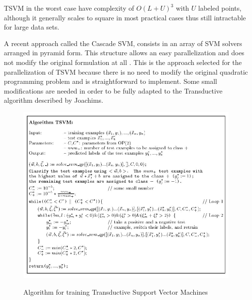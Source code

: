 TSVM in the worst case have complexity of $O(L+U)^{3}$ with $U$
labeled points, although it generally scales to square in most practical
cases \cite{Joachims/99a} thus still intractable for large data sets.

A recent approach called the Cascade SVM, consists in an array of SVM
solvers arranged in pyramid form. This structure allows an easy parallelization
and does not modify the original formulation at all \cite{GrafCBDV04,ZhangZY05}.
This is the approach selected for the parallelization of TSVM because
there is no need to modify the original quadratic programming problem
and is straightforward to implement. Some small modifications are
needed in order to be fully adapted to the Transductive algorithm
described by Joachims. 
%
\begin{figure}[H]
\begin{centering}
\includegraphics[scale=0.3]{images/joachims-algorithm}\label{fig:alg-tsvm}
\par\end{centering}
\caption{Algorithm for training Transductive Support Vector Machines \cite{Joachims99c}}
\end{figure}
